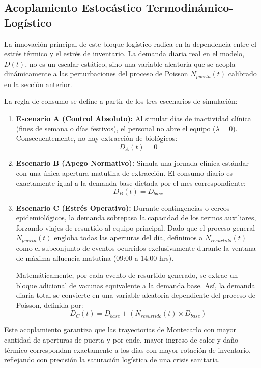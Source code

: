 \documentclass[
  spanish,
  letterpaper,
  DIV=11,
  numbers=noendperiod]{scrreprt}
\theoremstyle{plain}
\theoremstyle{plain}
\theoremstyle{plain}
\theoremstyle{definition}
\theoremstyle{remark}
\begin{document}
\subsection{Acoplamiento Estocástico
Termodinámico-Logístico}\label{acoplamiento-estocuxe1stico-termodinuxe1mico-loguxedstico}

La innovación principal de este bloque logístico radica en la
dependencia entre el estrés térmico y el estrés de inventario. La
demanda diaria real en el modelo, \(D(t)\), no es un escalar estático,
sino una variable aleatoria que se acopla dinámicamente a las
perturbaciones del proceso de Poisson \(N_{puerta}(t)\) calibrado en la
sección anterior.

La regla de consumo se define a partir de los tres escenarios de
simulación:

\begin{enumerate}
\def\labelenumi{\arabic{enumi}.}
\item
  \textbf{Escenario A (Control Absoluto):} Al simular días de
  inactividad clínica (fines de semana o días festivos), el personal no
  abre el equipo (\(\lambda = 0\)). Consecuentemente, no hay extracción
  de biológicos: \[D_A(t) = 0\]
\item
  \textbf{Escenario B (Apego Normativo):} Simula una jornada clínica
  estándar con una única apertura matutina de extracción. El consumo
  diario es exactamente igual a la demanda base dictada por el mes
  correspondiente: \[D_B(t) = D_{base}\]
\item
  \textbf{Escenario C (Estrés Operativo):} Durante contingencias o
  cercos epidemiológicos, la demanda sobrepasa la capacidad de los
  termos auxiliares, forzando viajes de resurtido al equipo principal.
  Dado que el proceso general \(N_{puerta}(t)\) engloba todas las
  aperturas del día, definimos a \(N_{resurtido}(t)\) como el
  subconjunto de eventos ocurridos exclusivamente durante la ventana de
  máxima afluencia matutina (09:00 a 14:00 hrs).

  Matemáticamente, por cada evento de resurtido generado, se extrae un
  bloque adicional de vacunas equivalente a la demanda base. Así, la
  demanda diaria total se convierte en una variable aleatoria
  dependiente del proceso de Poisson, definida por:
  \[D_C(t) = D_{base} + \left( N_{resurtido}(t) \times D_{base} \right)\]
\end{enumerate}

Este acoplamiento garantiza que las trayectorias de Montecarlo con mayor
cantidad de aperturas de puerta y por ende, mayor ingreso de calor y
daño térmico correspondan exactamente a los días con mayor rotación de
inventario, reflejando con precisión la saturación logística de una
crisis sanitaria.
\end{document}
